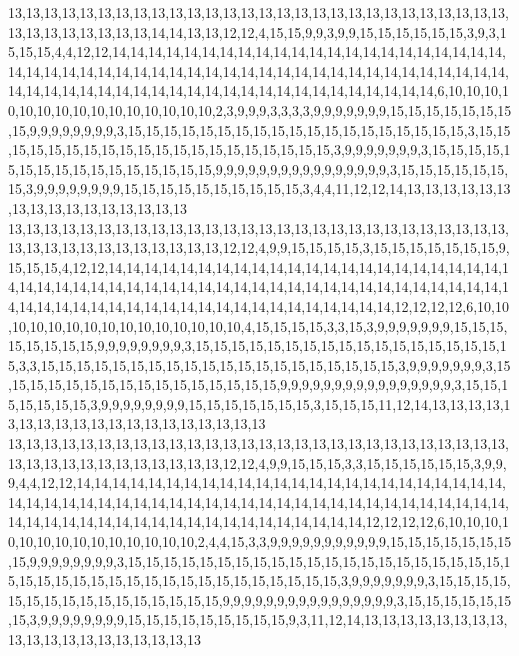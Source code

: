 13,13,13,13,13,13,13,13,13,13,13,13,13,13,13,13,13,13,13,13,13,13,13,13,13,13,13,13,13,13,13,13,13,13,13,13,14,14,13,13,12,12,4,15,15,9,9,3,9,9,15,15,15,15,15,15,3,9,3,15,15,15,4,4,12,12,14,14,14,14,14,14,14,14,14,14,14,14,14,14,14,14,14,14,14,14,14,14,14,14,14,14,14,14,14,14,14,14,14,14,14,14,14,14,14,14,14,14,14,14,14,14,14,14,14,14,14,14,14,14,14,14,14,14,14,14,14,14,14,14,14,14,14,14,14,14,14,14,14,14,6,10,10,10,10,10,10,10,10,10,10,10,10,10,10,10,2,3,9,9,9,3,3,3,3,9,9,9,9,9,9,9,15,15,15,15,15,15,15,15,9,9,9,9,9,9,9,9,3,15,15,15,15,15,15,15,15,15,15,15,15,15,15,15,15,15,15,15,3,15,15,15,15,15,15,15,15,15,15,15,15,15,15,15,15,15,15,15,15,3,9,9,9,9,9,9,9,3,15,15,15,15,15,15,15,15,15,15,15,15,15,15,15,15,9,9,9,9,9,9,9,9,9,9,9,9,9,9,9,9,3,15,15,15,15,15,15,15,3,9,9,9,9,9,9,9,9,15,15,15,15,15,15,15,15,15,15,3,4,4,11,12,12,14,13,13,13,13,13,13,13,13,13,13,13,13,13,13,13,13
13,13,13,13,13,13,13,13,13,13,13,13,13,13,13,13,13,13,13,13,13,13,13,13,13,13,13,13,13,13,13,13,13,13,13,13,13,13,13,13,12,12,4,9,9,15,15,15,15,3,15,15,15,15,15,15,15,9,15,15,15,4,12,12,14,14,14,14,14,14,14,14,14,14,14,14,14,14,14,14,14,14,14,14,14,14,14,14,14,14,14,14,14,14,14,14,14,14,14,14,14,14,14,14,14,14,14,14,14,14,14,14,14,14,14,14,14,14,14,14,14,14,14,14,14,14,14,14,14,14,14,14,14,14,14,14,12,12,12,12,6,10,10,10,10,10,10,10,10,10,10,10,10,10,10,10,4,15,15,15,15,3,3,15,3,9,9,9,9,9,9,9,15,15,15,15,15,15,15,15,9,9,9,9,9,9,9,9,3,15,15,15,15,15,15,15,15,15,15,15,15,15,15,15,15,15,15,3,3,15,15,15,15,15,15,15,15,15,15,15,15,15,15,15,15,15,15,15,15,3,9,9,9,9,9,9,9,3,15,15,15,15,15,15,15,15,15,15,15,15,15,15,15,15,9,9,9,9,9,9,9,9,9,9,9,9,9,9,9,9,3,15,15,15,15,15,15,15,3,9,9,9,9,9,9,9,9,15,15,15,15,15,15,15,3,15,15,15,11,12,14,13,13,13,13,13,13,13,13,13,13,13,13,13,13,13,13,13,13,13
13,13,13,13,13,13,13,13,13,13,13,13,13,13,13,13,13,13,13,13,13,13,13,13,13,13,13,13,13,13,13,13,13,13,13,13,13,13,13,13,12,12,4,9,9,15,15,15,3,3,15,15,15,15,15,15,3,9,9,9,4,4,12,12,14,14,14,14,14,14,14,14,14,14,14,14,14,14,14,14,14,14,14,14,14,14,14,14,14,14,14,14,14,14,14,14,14,14,14,14,14,14,14,14,14,14,14,14,14,14,14,14,14,14,14,14,14,14,14,14,14,14,14,14,14,14,14,14,14,14,14,14,14,14,14,14,12,12,12,12,6,10,10,10,10,10,10,10,10,10,10,10,10,10,10,2,4,4,15,3,3,9,9,9,9,9,9,9,9,9,9,9,15,15,15,15,15,15,15,15,9,9,9,9,9,9,9,9,3,15,15,15,15,15,15,15,15,15,15,15,15,15,15,15,15,15,15,15,15,15,15,15,15,15,15,15,15,15,15,15,15,15,15,15,15,15,15,15,15,3,9,9,9,9,9,9,9,3,15,15,15,15,15,15,15,15,15,15,15,15,15,15,15,15,9,9,9,9,9,9,9,9,9,9,9,9,9,9,9,9,3,15,15,15,15,15,15,15,3,9,9,9,9,9,9,9,9,15,15,15,15,15,15,15,15,15,9,3,11,12,14,13,13,13,13,13,13,13,13,13,13,13,13,13,13,13,13,13,13,13
